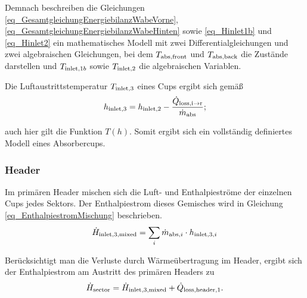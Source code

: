 Demnach beschreiben die Gleichungen \ref{eq_GesamtgleichungEnergiebilanzWabeVorne}, \ref{eq_GesamtgleichungEnergiebilanzWabeHinten} sowie \ref{eq_Hinlet1b} und \ref{eq_Hinlet2} ein mathematisches Modell mit zwei Differentialgleichungen und zwei algebraischen Gleichungen, bei dem $T_{\mathrm{abs,front}}$ und $T_{\mathrm{abs,back}}$ die Zustände darstellen und $T_{\mathrm{inlet,}1b}$ sowie $T_{\mathrm{inlet,}2}$ die algebraischen Variablen.

Die Luftaustrittstemperatur $T_{\mathrm{inlet,}3}$ eines Cups ergibt sich gemäß
\begin{equation} \label{eq_Hinlet3}
h_{\mathrm{inlet,}3} = h_{\mathrm{inlet,}2} - \frac{\dot{Q}_{\mathrm{loss,i \to r}}}{\dot{m}_{\mathrm{abs}}};
\end{equation}

\vspace*{-\baselineskip}auch hier gilt die Funktion $T(h)$. Somit ergibt sich ein vollständig definiertes Modell eines Absorbercups.


\subsubsection*{Header} \label{subsubsec_Header}
Im primären Header mischen sich die Luft- und Enthalpieströme der einzelnen Cups jedes Sektors.
Der Enthalpiestrom dieses Gemisches wird in Gleichung \ref{eq_EnthalpiestromMischung} beschrieben.
\begin{equation} \label{eq_EnthalpiestromMischung}
    \dot{H}_{\mathrm{inlet,}3,\mathrm{mixed}} = \sum_i \dot{m}_{\mathrm{abs}, i} \cdot h_{\mathrm{inlet,}3,i}
\end{equation}

Berücksichtigt man die Verluste durch Wärmeübertragung im Header, ergibt sich der Enthalpiestrom am Austritt des primären Headers zu
\begin{equation} \label{eq_AustrittHeader1}
\dot{H}_{\mathrm{sector}} = \dot{H}_{\mathrm{inlet,}3,\mathrm{mixed}} + \dot{Q}_{\mathrm{loss,header,1}}.
\end{equation}

